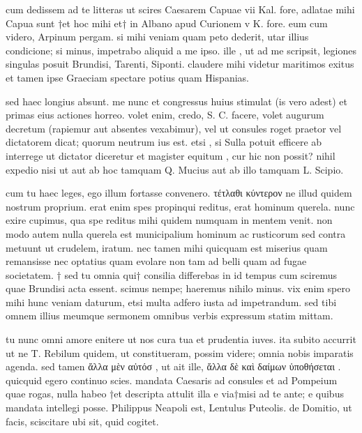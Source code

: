 


 cum dedissem ad te litteras ut scires Caesarem Capuae vii Kal. fore, adlatae mihi Capua sunt †et hoc mihi et† in Albano apud Curionem v K. fore. eum cum videro, Arpinum pergam. si mihi veniam quam peto dederit, utar illius condicione; si minus, impetrabo aliquid a me ipso. ille , ut ad me scripsit, legiones singulas posuit Brundisi, Tarenti, Siponti. claudere mihi videtur maritimos exitus et tamen ipse Graeciam spectare potius quam Hispanias.

 sed haec longius absunt. me nunc et congressus huius stimulat (is vero adest) et primas eius actiones horreo. volet enim, credo, S. C. facere, volet augurum decretum (rapiemur aut absentes vexabimur), vel ut consules roget praetor vel dictatorem dicat; quorum neutrum ius est. etsi , si Sulla potuit efficere ab interrege ut dictator diceretur et magister equitum , cur hic non possit? nihil expedio nisi ut aut ab hoc tamquam Q. Mucius aut ab illo tamquam L. Scipio.

 cum tu haec leges, ego illum fortasse convenero. τέτλαθι κύντερον ne illud quidem nostrum proprium. erat enim spes propinqui reditus, erat hominum querela. nunc exire cupimus, qua spe reditus mihi quidem numquam in mentem venit. non modo autem nulla querela est municipalium hominum ac rusticorum sed contra metuunt ut crudelem, iratum. nec tamen mihi quicquam est miserius quam remansisse nec optatius quam evolare non tam ad belli quam ad fugae societatem. † sed tu omnia qui† consilia differebas in id tempus cum sciremus quae Brundisi acta essent. scimus nempe; haeremus nihilo minus. vix enim spero mihi hunc veniam daturum, etsi multa adfero iusta ad impetrandum. sed tibi omnem illius meumque sermonem omnibus verbis expressum statim mittam.

 tu nunc omni amore enitere ut nos cura tua et prudentia iuves. ita subito accurrit ut ne T. Rebilum quidem, ut constitueram, possim videre; omnia nobis imparatis agenda. sed tamen ἄλλα μὲν αὐτόσ , ut ait ille, ἄλλα δὲ καὶ δαίμων ὑποθήσεται . quicquid egero continuo scies. mandata Caesaris ad consules et ad Pompeium quae rogas, nulla habeo †et descripta attulit illa e via†misi ad te ante; e quibus mandata intellegi posse. Philippus Neapoli est, Lentulus Puteolis. de Domitio, ut facis, sciscitare ubi sit, quid cogitet.

